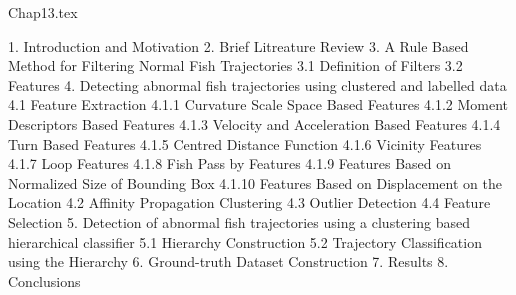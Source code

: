 Chap13.tex

1. Introduction and Motivation
2. Brief Litreature Review
3. A Rule Based Method for Filtering Normal Fish Trajectories
3.1 Definition of Filters
3.2 Features
4. Detecting abnormal fish trajectories using clustered and labelled data
4.1 Feature Extraction
4.1.1 Curvature Scale Space Based Features
4.1.2 Moment Descriptors Based Features
4.1.3 Velocity and Acceleration Based Features
4.1.4 Turn Based Features
4.1.5 Centred Distance Function
4.1.6 Vicinity Features
4.1.7 Loop Features
4.1.8 Fish Pass by Features
4.1.9 Features Based on Normalized Size of Bounding Box
4.1.10 Features Based on Displacement on the Location
4.2 Affinity Propagation Clustering
4.3 Outlier Detection
4.4 Feature Selection
5. Detection of abnormal fish trajectories using a clustering based hierarchical classifier
5.1 Hierarchy Construction
5.2 Trajectory Classification using the Hierarchy
6. Ground-truth Dataset Construction
7. Results
8. Conclusions

